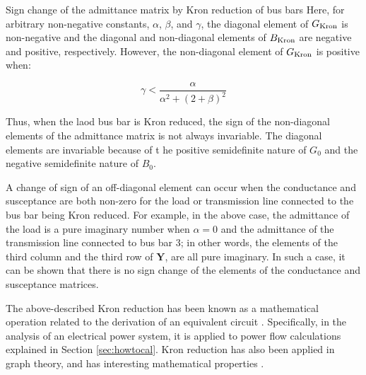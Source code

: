 \documentclass[graybox, envcountchap]{svmult}
\begin{document}
\begin{example}{Sign change of the admittance matrix by Kron reduction of bus
bars}
Here, for arbitrary non-negative constants, $\alpha$, $\beta$, and $\gamma$, the
diagonal element of $G_{\rm Kron}$ is non-negative and the diagonal and
non-diagonal elements of $B_{\rm Kron}$ are negative and positive, respectively.
However, the non-diagonal element of $G_{\rm Kron}$ is positive when:

\begin{equation*}
  \gamma < \frac{\alpha}{\alpha^2 + (2+\beta)^2} 
\end{equation*}

Thus, when the laod bus bar is Kron reduced, the sign of the non-diagonal
elements of the admittance matrix is not always invariable. The diagonal
elements are invariable because of t he positive semidefinite nature of $G_0$
and the negative semidefinite nature of $B_0$.

A change of sign of an off-diagonal element can occur when the conductance and
susceptance are both non-zero for the load or transmission line connected to the
bus bar being Kron reduced. For example, in the above case, the admittance of
the load is a pure imaginary number when $\alpha=0$ and the admittance of the
transmission line connected to bus bar 3; in other words, the elements of the
third column and the third row of $\bm{Y}$, are all pure imaginary. In such a
case, it can be shown that there is no sign change of the elements of the
conductance and susceptance matrices.

\end{example}

The above-described Kron reduction has been known as a mathematical operation
related to the derivation of an equivalent circuit \cite{kron1939tensor}.
Specifically, in the analysis of an electrical power system, it is applied to
power flow calculations explained in Section \ref{sec:howtocal}. Kron reduction
has also been applied in graph theory, and has interesting mathematical
properties \cite{dorfler2013kron}.


%

\end{document}
